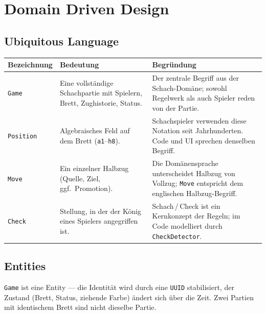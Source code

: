 \documentclass[a4paper,12pt]{article}
\let\oldsection\section
\renewcommand{\section}{\clearpage\oldsection}
\begin{document}
\section{Domain Driven Design}

\subsection*{Ubiquitous Language}

\bigskip
\begin{tabularx}{\textwidth}{|l|X|X|}
    \hline
    \textbf{Bezeichnung} & \textbf{Bedeutung} & \textbf{Begründung} \\
    \hline
    \texttt{Game}     & Eine vollständige Schachpartie mit Spielern, Brett, Zughistorie, Status. & Der zentrale Begriff aus der Schach-Domäne; sowohl Regelwerk als auch Spieler reden von \glqq{}der Partie\grqq{}. \\[1.2em]
    \hline
    \texttt{Position} & Algebraisches Feld auf dem Brett (\texttt{a1}--\texttt{h8}). & Schachspieler verwenden diese Notation seit Jahrhunderten. Code und UI sprechen denselben Begriff. \\[1.2em]
    \hline
    \texttt{Move}     & Ein einzelner Halbzug (Quelle, Ziel, ggf.\ Promotion). & Die Domänensprache unterscheidet Halbzug von Vollzug; \texttt{Move} entspricht dem englischen Halbzug-Begriff. \\[1.2em]
    \hline
    \texttt{Check}    & Stellung, in der der König eines Spielers angegriffen ist. & Schach\,/\,Check ist ein Kernkonzept der Regeln; im Code modelliert durch \texttt{CheckDetector}. \\[1.2em]
    \hline
\end{tabularx}

\bigskip

\subsection*{Entities}

\texttt{Game} ist eine Entity --- die Identität wird durch eine \texttt{UUID} stabilisiert, der
Zustand (Brett, Status, ziehende Farbe) ändert sich über die Zeit. Zwei Partien mit identischem
Brett sind nicht dieselbe Partie.

\end{document}

